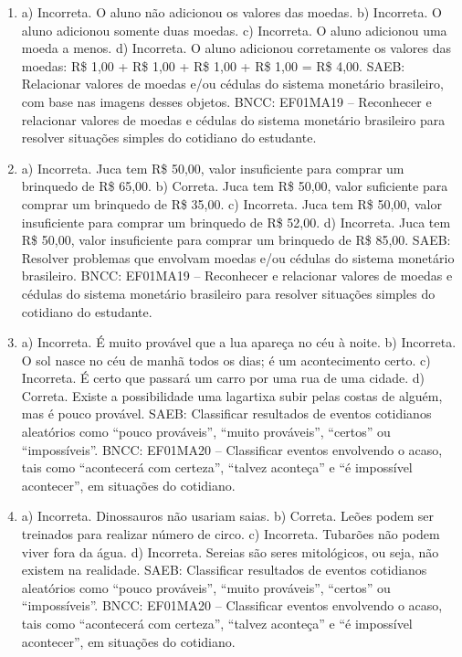 \begin{enumerate}
\item
a) Incorreta. O aluno não adicionou os valores das moedas.
b) Incorreta. O aluno adicionou somente duas moedas.
c) Incorreta. O aluno adicionou uma moeda a menos.
d) Incorreta. O aluno adicionou corretamente os valores das moedas:
R\$ 1,00 + R\$ 1,00 + R\$ 1,00 + R\$ 1,00 = R\$ 4,00.
SAEB: Relacionar valores de moedas e/ou cédulas do sistema
monetário brasileiro, com base nas imagens desses objetos.
BNCC: EF01MA19 -- Reconhecer e relacionar valores de moedas e cédulas do
sistema monetário brasileiro para resolver situações simples do
cotidiano do estudante.

\item
a) Incorreta. Juca tem R\$ 50,00, valor insuficiente para comprar um brinquedo de R\$ 65,00.
b) Correta. Juca tem R\$ 50,00, valor suficiente para comprar um brinquedo de R\$ 35,00.
c) Incorreta. Juca tem R\$ 50,00, valor insuficiente para comprar um brinquedo de R\$ 52,00.
d) Incorreta. Juca tem R\$ 50,00, valor insuficiente para comprar um brinquedo de R\$ 85,00.
SAEB: Resolver problemas que envolvam moedas e/ou cédulas do
sistema monetário brasileiro.
BNCC: EF01MA19 -- Reconhecer e relacionar valores de moedas e cédulas do
sistema monetário brasileiro para resolver situações simples do
cotidiano do estudante.

\item
a) Incorreta. É muito provável que a lua apareça no céu à noite.
b) Incorreta. O sol nasce no céu de manhã todos os dias; é um acontecimento certo.
c) Incorreta. É certo que passará um carro por uma rua de uma cidade.
d) Correta. Existe a possibilidade uma lagartixa subir pelas costas de alguém, mas é pouco provável.
SAEB: Classificar resultados de eventos cotidianos aleatórios como
``pouco prováveis'', ``muito prováveis'', ``certos'' ou ``impossíveis''.
BNCC: EF01MA20 -- Classificar eventos envolvendo o acaso, tais como
``acontecerá com certeza'', ``talvez aconteça'' e ``é impossível
acontecer'', em situações do cotidiano.

\item
a) Incorreta. Dinossauros não usariam saias.
b) Correta. Leões podem ser treinados para realizar número de circo.
c) Incorreta. Tubarões não podem viver fora da água.
d) Incorreta. Sereias são seres mitológicos, ou seja, não existem na
realidade.
SAEB: Classificar resultados de eventos cotidianos aleatórios como
``pouco prováveis'', ``muito prováveis'', ``certos'' ou ``impossíveis''.
BNCC: EF01MA20 -- Classificar eventos envolvendo o acaso, tais como
``acontecerá com certeza'', ``talvez aconteça'' e ``é impossível
acontecer'', em situações do cotidiano.


\end{enumerate}
